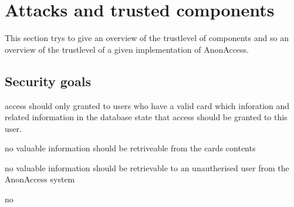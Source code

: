 \section{Attacks and trusted components}
This section trys to give an overview of the trustlevel of components and so an overview of the trustlevel of a given implementation of AnonAccess.

\subsection{Security goals}
\begin{itmeize}
 \item access should only granted to users who have a valid card which inforation and related information in the database state that access should be granted to this user.
 \item no valuable information should be retriveable from the cards contents
 \item no valuable information should be retrievable to an unautherised user from the AnonAccess system
 \item no 
\end{itmeize}